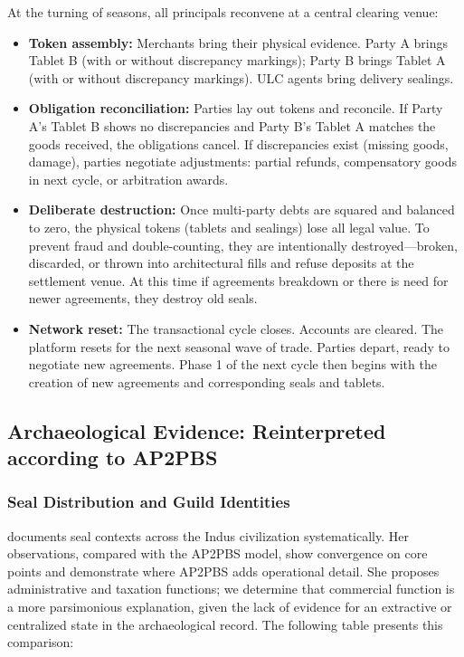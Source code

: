 \documentclass[12pt]{article}
\begin{document}
At the turning of seasons, all principals reconvene at a central clearing venue:

\begin{itemize}
\item \textbf{Token assembly:} Merchants bring their physical evidence.
Party A brings Tablet B (with or without discrepancy markings); Party B brings
Tablet A (with or without discrepancy markings). ULC agents bring delivery
sealings.

\item \textbf{Obligation reconciliation:} Parties lay out tokens and reconcile.
If Party A's Tablet B shows no discrepancies and Party B's Tablet A matches the
goods received, the obligations cancel. If discrepancies exist (missing goods,
damage), parties negotiate adjustments: partial refunds, compensatory goods
in next cycle, or arbitration awards.

\item \textbf{Deliberate destruction:} Once multi-party debts are
squared and balanced to zero, the physical tokens (tablets and sealings) lose
all legal value. To prevent fraud and double-counting, they are intentionally
destroyed—broken, discarded, or thrown into architectural fills and refuse
deposits at the settlement venue. At this time if agreements breakdown or
there is need for newer agreements, they destroy old seals.

\item \textbf{Network reset:} The transactional cycle closes. Accounts are
cleared. The platform resets for the next seasonal wave of trade. Parties
depart, ready to negotiate new agreements.  Phase 1 of the next cycle then
begins with the creation of new agreements and corresponding seals and
tablets.
\end{itemize}

\subsection{Archaeological Evidence: Reinterpreted according to AP2PBS}

\subsubsection{Seal Distribution and Guild Identities}

\citet{mukhopadhyay2023} documents seal contexts across the Indus civilization
systematically. Her observations, compared with the AP2PBS model, show convergence
on core points and demonstrate where AP2PBS adds operational detail. She proposes
administrative and taxation functions; we determine that commercial function is
a more parsimonious explanation, given the lack of evidence for an extractive or
centralized state in the archaeological record. The following table presents this
comparison:
\end{document}
